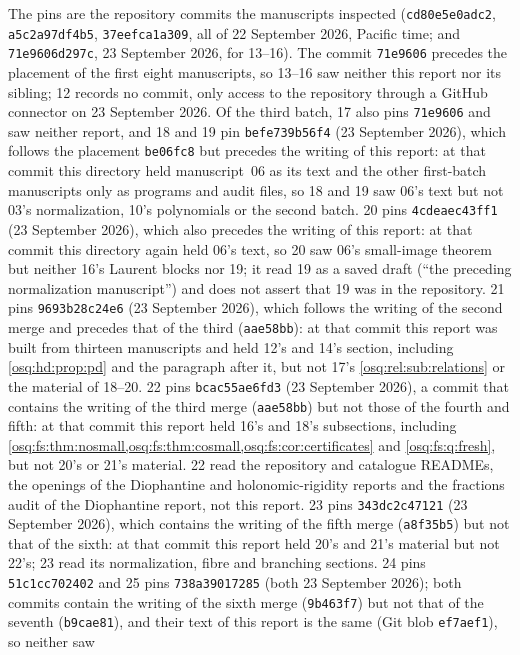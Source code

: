 \documentclass[11pt,letterpaper]{article}
\numberwithin{equation}{section}
\theoremstyle{definition}
\theoremstyle{remark}
\theoremstyle{plain}
\begin{document}
The pins are the repository commits the manuscripts inspected (\texttt{cd80e5e0adc2},
\texttt{a5c2a97df4b5}, \texttt{37eefca1a309}, all of 22 September 2026, Pacific time; and
\texttt{71e9606d297c}, 23 September 2026, for 13--16). The commit \texttt{71e9606} precedes the placement
of the first eight manuscripts, so 13--16 saw neither this report nor its sibling; 12 records no commit,
only access to the repository through a GitHub connector on 23 September 2026. Of the third batch, 17 also
pins \texttt{71e9606} and saw neither report, and 18 and 19 pin \texttt{befe739b56f4} (23 September 2026),
which follows the placement \texttt{be06fc8} but precedes the writing of this report: at that commit this
directory held manuscript~06 as its text and the other first-batch manuscripts only as programs and audit
files, so 18 and 19 saw 06's text but not 03's normalization, 10's polynomials or the second batch. 20 pins
\texttt{4cdeaec43ff1} (23 September 2026), which also precedes the writing of this report: at that commit this directory
again held 06's text, so 20 saw 06's small-image theorem but neither 16's Laurent blocks nor 19; it read 19 as a saved
draft (``the preceding normalization manuscript'') and does not assert that 19 was in the repository. 21 pins
\texttt{9693b28c24e6} (23 September 2026), which follows the writing of the second merge and precedes that of the third
(\texttt{aae58bb}): at that commit this report was built from thirteen manuscripts and held 12's and 14's section, including
\cref{osq:hd:prop:pd} and the paragraph after it, but not 17's \cref{osq:rel:sub:relations} or the material of 18--20.
22 pins \texttt{bcac55ae6fd3} (23 September 2026), a commit that contains the writing of the third merge (\texttt{aae58bb}) but not those of the
fourth and fifth: at that commit this report held 16's and 18's subsections, including \cref{osq:fs:thm:nosmall,osq:fs:thm:cosmall,osq:fs:cor:certificates}
and \cref{osq:fs:q:fresh}, but not 20's or 21's material. 22 read the repository and catalogue READMEs, the openings of the Diophantine and
holonomic-rigidity reports and the fractions audit of the Diophantine report, not this report.
23 pins \texttt{343dc2c47121} (23 September 2026), which contains the writing of the fifth merge (\texttt{a8f35b5}) but not that of the sixth:
at that commit this report held 20's and 21's material but not 22's; 23 read its normalization, fibre and branching sections.
24 pins \texttt{51c1cc702402} and 25 pins \texttt{738a39017285} (both 23 September 2026); both commits contain the writing of the sixth merge
(\texttt{9b463f7}) but not that of the seventh (\texttt{b9cae81}), and their text of this report is the same (Git blob \texttt{ef7aef1}), so neither saw
\end{document}
